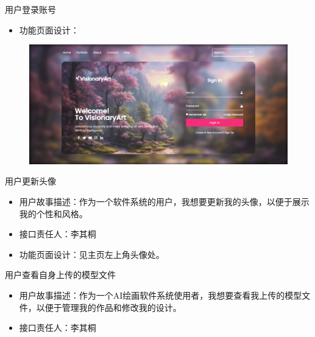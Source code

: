\begin{frame}{用户登录账号}
    \begin{itemize}
        \item 功能页面设计：
    \end{itemize}
    \begin{figure}[H]
        \centering
        \includegraphics[width=\textwidth]{contents/figure/login.png}
    \end{figure}
\end{frame}

\begin{frame}{用户更新头像}
    \begin{itemize}
        \item 用户故事描述：作为一个软件系统的用户，我想要更新我的头像，以便于展示我的个性和风格。
        \item 接口责任人：李其桐
        \item 功能页面设计：见主页左上角头像处。
    \end{itemize}
\end{frame}

\begin{frame}{用户查看自身上传的模型文件}
    \begin{itemize}
        \item 用户故事描述：作为一个AI绘画软件系统使用者，我想要查看我上传的模型文件，以便于管理我的作品和修改我的设计。
        \item 接口责任人：李其桐
    \end{itemize}
\end{frame}

